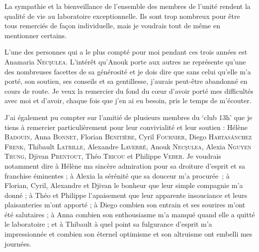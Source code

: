 La sympathie et la bienveillance de l'ensemble des membres de l'unité rendent la qualité de vie au laboratoire exceptionnelle.
Ils sont trop nombreux pour être tous remerciés de façon individuelle, mais je voudrais tout de même en mentionner certains.



L'une des personnes qui a le plus compté pour moi pendant ces trois années est Anamaria \textsc{Nec\c{s}ulea}.
L'intérêt qu'Anouk porte aux autres ne représente qu'une des nombreuses facettes de sa générosité et je dois dire que sans celui qu'elle m'a porté, son soutien, ses conseils et sa gentillesse, j'aurais peut-être abandonné en cours de route.
Je veux la remercier du fond du cœur d'avoir porté mes difficultés avec moi et d'avoir, chaque fois que j'en ai eu besoin, pris le temps de m'écouter.


J'ai également pu compter sur l'amitié de plusieurs membres du ‘club 13h’ que je tiens à remercier particulièrement pour leur convivialité et leur soutien :
Hélène \textsc{Badouin},
Anna \textsc{Bonnet},
Florian \textsc{Benitière},
Cyril \textsc{Fournier},
Diego \textsc{Hartas\'anchez Frenk},
Thibault \textsc{Latrille},
Alexandre \textsc{Laverré}, 
Anouk \textsc{Nec\c{s}ulea},
Alexia \textsc{Nguyen Trung},
Djivan \textsc{Prentout},
Théo \textsc{Tricou} et
Philippe \textsc{Veber}.
Je voudrais notamment dire 
à Hélène ma sincère admiration pour sa droiture d'esprit et sa franchise éminentes ; 
à Alexia la sérénité que sa douceur m'a procurée~;
à Florian, Cyril, Alexandre et Djivan le bonheur que leur simple compagnie m'a donné ;
à Théo et Philippe l'apaisement que leur apparente insouciance et leurs plaisanteries m'ont apporté ; 
à Diego combien son entrain et ses sourires m'ont été salutaires ;
à Anna combien son enthousiasme m'a manqué quand elle a quitté le laboratoire ;
et à Thibault à quel point sa fulgurance d'esprit m'a impressionnée et combien son éternel optimisme et son altruisme ont embelli mes journées.



